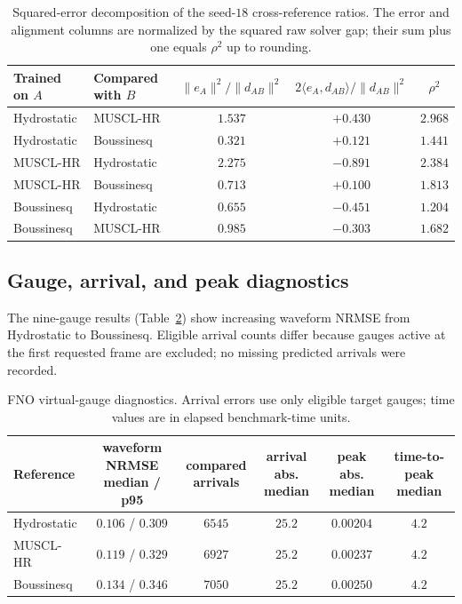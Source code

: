 \begin{table}[pos=!htbp]
\centering
\caption{Squared-error decomposition of the seed-$18$ cross-reference ratios. The error and alignment columns are normalized by the squared raw solver gap; their sum plus one equals $\rho^2$ up to rounding.}
\label{tab:ratio-decomposition}
\small
\begin{tabular}{llccc}
    \toprule
    Trained on $A$ & Compared with $B$ & $\lVert e_A\rVert^2/\lVert d_{AB}\rVert^2$ & $2\langle e_A,d_{AB}\rangle/\lVert d_{AB}\rVert^2$ & $\rho^2$ \\
    \midrule
    Hydrostatic & MUSCL-HR   & $1.537$ & $+0.430$ & $2.968$ \\
    Hydrostatic & Boussinesq & $0.321$ & $+0.121$ & $1.441$ \\
    MUSCL-HR    & Hydrostatic & $2.275$ & $-0.891$ & $2.384$ \\
    MUSCL-HR    & Boussinesq  & $0.713$ & $+0.100$ & $1.813$ \\
    Boussinesq  & Hydrostatic & $0.655$ & $-0.451$ & $1.204$ \\
    Boussinesq  & MUSCL-HR    & $0.985$ & $-0.303$ & $1.682$ \\
    \bottomrule
\end{tabular}
\end{table}

\FloatBarrier
\subsection{Gauge, arrival, and peak diagnostics}
\label{subsec:res-wave}

The nine-gauge results (Table~\ref{tab:wave-metrics}) show increasing waveform NRMSE from Hydrostatic to Boussinesq. Eligible arrival counts differ because gauges active at the first requested frame are excluded; no missing predicted arrivals were recorded.

\begin{table}[pos=!htbp]
\centering
\caption{FNO virtual-gauge diagnostics. Arrival errors use only eligible target gauges; time values are in elapsed benchmark-time units.}
\label{tab:wave-metrics}
\small
\setlength{\tabcolsep}{3pt}
\begin{tabular}{lccccc}
    \toprule
    Reference & \shortstack{waveform NRMSE\\median / p95} & \shortstack{compared\\arrivals} & \shortstack{arrival abs.\\median} & \shortstack{peak abs.\\median} & \shortstack{time-to-peak\\median} \\
    \midrule
    Hydrostatic & $0.106$ / $0.309$ & $6545$ & $25.2$ & $0.00204$ & $4.2$ \\
    MUSCL-HR    & $0.119$ / $0.329$ & $6927$ & $25.2$ & $0.00237$ & $4.2$ \\
    Boussinesq  & $0.134$ / $0.346$ & $7050$ & $25.2$ & $0.00250$ & $4.2$ \\
    \bottomrule
\end{tabular}
\end{table}

